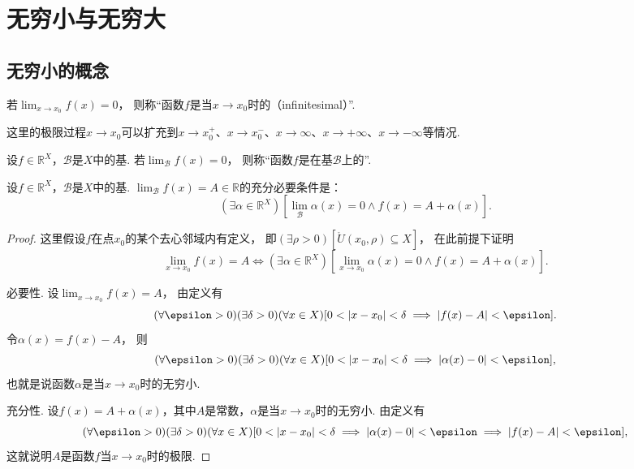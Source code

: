 \section{无穷小与无穷大}
\subsection{无穷小的概念}
\begin{definition}
若\(\lim_{x \to x_0} f(x) = 0\)，
则称“函数\(f\)是当\(x \to x_0\)时的（infinitesimal）”.
\end{definition}
这里的极限过程\(x \to x_0\)可以扩充到\(x \to x_0^+\)、\(x \to x_0^-\)、\(x \to \infty\)、\(x \to +\infty\)、\(x \to -\infty\)等情况.

\begin{definition}
设\(f\in\mathbb{R}^X\)，\(\mathcal{B}\)是\(X\)中的基.
若\(\lim_\mathcal{B} f(x) = 0\)，
则称“函数\(f\)是在基\(\mathcal{B}\)上的”.
\end{definition}

\begin{theorem}
设\(f\in\mathbb{R}^X\)，\(\mathcal{B}\)是\(X\)中的基.
\(\lim_\mathcal{B} f(x) = A \in \mathbb{R}\)的充分必要条件是：\[
	(\exists\alpha\in\mathbb{R}^X)
	\left[
		\lim_\mathcal{B} \alpha(x) = 0
		\land
		f(x) = A + \alpha(x)
	\right].
\]
\begin{proof}
这里假设\(f\)在点\(x_0\)的某个去心邻域内有定义，
即\((\exists\rho>0)[\mathring{U}(x_0,\rho) \subseteq X]\)，
在此前提下证明\[
	\lim_{x \to x_0} f(x) = A
	\iff
	(\exists\alpha\in\mathbb{R}^X)
	\left[
		\lim_{x \to x_0} \alpha(x) = 0
		\land
		f(x) = A + \alpha(x)
	\right].
\]

必要性.
设\(\lim_{x \to x_0} f(x) = A\)，
由定义有\[
	(\forall\epsilon>0)
	(\exists\delta>0)
	(\forall x\in X)
	[
		0<\abs{x-x_0}<\delta
		\implies
		\abs{f(x)-A}<\epsilon
	].
\]
令\(\alpha(x)=f(x)-A\)，
则\[
	(\forall\epsilon>0)
	(\exists\delta>0)
	(\forall x\in X)
	[
		0<\abs{x-x_0}<\delta
		\implies
		\abs{\alpha(x)-0}<\epsilon
	],
\]
也就是说函数\(\alpha\)是当\(x \to x_0\)时的无穷小.

充分性.
设\(f(x)=A+\alpha(x)\)，其中\(A\)是常数，\(\alpha\)是当\(x \to x_0\)时的无穷小.
由定义有\[
	(\forall\epsilon>0)
	(\exists\delta>0)
	(\forall x\in X)
	[
		0<\abs{x-x_0}<\delta
		\implies
		\abs{\alpha(x)-0}<\epsilon
		\implies
		\abs{f(x)-A}<\epsilon
	],
\]
这就说明\(A\)是函数\(f\)当\(x \to x_0\)时的极限.
\end{proof}
\end{theorem}

